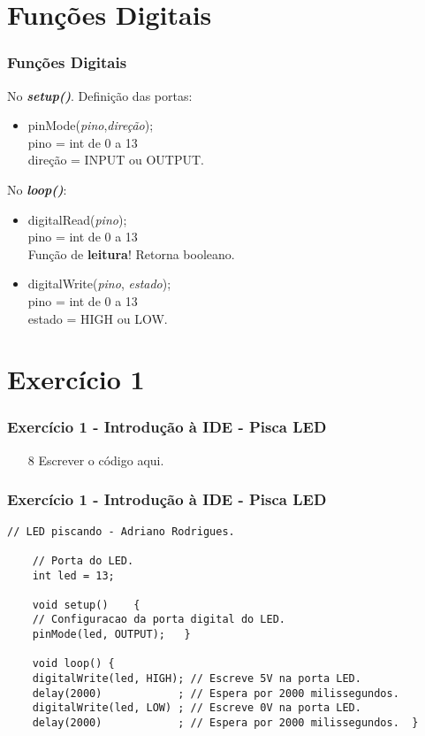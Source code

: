 \documentclass{beamer}
\begin{document}
\section{Funções Digitais}
\begin{frame}
	\frametitle{Funções Digitais}
	No \textit{\textbf{setup()}}. Definição das portas:
	\begin{itemize}
		\item pinMode(\textit{pino},\textit{direção});\\
		pino = int de 0 a 13\\
		direção = INPUT ou OUTPUT.
	\end{itemize}
	No \textit{\textbf{loop()}}:
	\begin{itemize}
		\item digitalRead(\textit{pino});\\
		pino = int de 0 a 13\\
		Função de \textbf{leitura}! Retorna booleano.
		\item digitalWrite(\textit{pino}, \textit{estado});\\
		pino = int de 0 a 13\\
		estado = HIGH ou LOW.
	\end{itemize}
\end{frame}

\section{Exercício 1}
\begin{frame}
	\frametitle{Exercício 1 - Introdução à IDE - Pisca LED}
	\begin{center}
	\end{center}
	\begin{itemize}
	
		\item[8] Escrever o código aqui.
	\end{itemize}
\end{frame}

\begin{frame}[fragile]
	\frametitle{Exercício 1 - Introdução à IDE - Pisca LED}
	
	\begin{lstlisting}[style=Arduino,basicstyle=\scriptsize \ttfamily]
	// LED piscando - Adriano Rodrigues.
	
	// Porta do LED.
	int led = 13;
	
	void setup()	{
	// Configuracao da porta digital do LED.
	pinMode(led, OUTPUT);	}
	
	void loop()	{
	digitalWrite(led, HIGH); // Escreve 5V na porta LED.
	delay(2000)            ; // Espera por 2000 milissegundos.
	digitalWrite(led, LOW) ; // Escreve 0V na porta LED.
	delay(2000)            ; // Espera por 2000 milissegundos.	} \end{lstlisting}
\end{frame}
\end{document}

